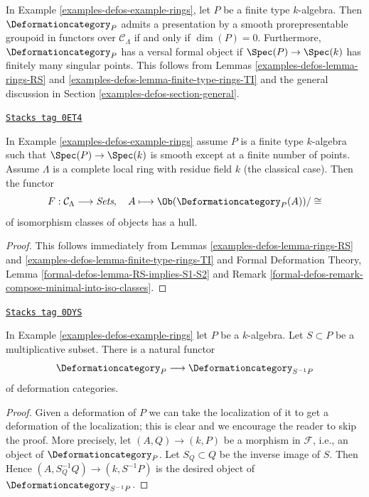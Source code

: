 In Example \ref{examples-defos-example-rings}, let $P$ be a finite type
$k$-algebra. Then $\Deformationcategory_P$
admits a presentation by a smooth prorepresentable groupoid in functors
over $\mathcal{C}_\Lambda$ if and only if $\dim(P) = 0$.
Furthermore, $\Deformationcategory_P$ has a versal formal
object if $\Spec(P) \to \Spec(k)$ has finitely many
singular points. This follows from Lemmas \ref{examples-defos-lemma-rings-RS} and
\ref{examples-defos-lemma-finite-type-rings-TI}
and the general discussion in Section \ref{examples-defos-section-general}.

\begin{lemma}
\label{examples-defos-lemma-rings-hull}
\href{https://stacks.math.columbia.edu/tag/0ET4}{\texttt{Stacks tag 0ET4}}

In Example \ref{examples-defos-example-rings} assume $P$ is a finite type
$k$-algebra such that $\Spec(P) \to \Spec(k)$ is smooth except
at a finite number of points.
Assume $\Lambda$ is a complete local ring with residue field $k$
(the classical case). Then the functor
$$
F : \mathcal{C}_\Lambda \longrightarrow \textit{Sets},\quad
A \longmapsto \Ob(\Deformationcategory_P(A))/\cong
$$
of isomorphism classes of objects has a hull.
\end{lemma}

\begin{proof}
This follows immediately from Lemmas \ref{examples-defos-lemma-rings-RS} and
\ref{examples-defos-lemma-finite-type-rings-TI} and
Formal Deformation Theory, Lemma \ref{formal-defos-lemma-RS-implies-S1-S2}
and Remark \ref{formal-defos-remark-compose-minimal-into-iso-classes}.
\end{proof}

\begin{lemma}[Localization]
\label{examples-defos-lemma-localization}
\href{https://stacks.math.columbia.edu/tag/0DYS}{\texttt{Stacks tag 0DYS}}

In Example \ref{examples-defos-example-rings} let $P$ be a $k$-algebra.
Let $S \subset P$ be a multiplicative subset. There is a natural functor
$$
\Deformationcategory_P \longrightarrow \Deformationcategory_{S^{-1}P}
$$
of deformation categories.
\end{lemma}

\begin{proof}
Given a deformation of $P$ we can take the localization
of it to get a deformation of the localization; this is
clear and we encourage the reader to skip the proof. More precisely,
let $(A, Q) \to (k, P)$ be a morphism in $\mathcal{F}$, i.e.,
an object of $\Deformationcategory_P$. Let $S_Q \subset Q$ be the
inverse image of $S$. Then
Hence $(A, S_Q^{-1}Q) \to (k, S^{-1}P)$
is the desired object of $\Deformationcategory_{S^{-1}P}$.
\end{proof}

